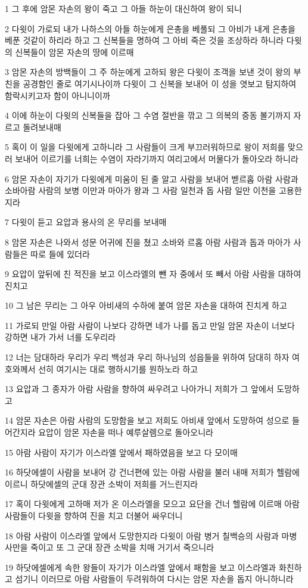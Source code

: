\par 1 그 후에 암몬 자손의 왕이 죽고 그 아들 하눈이 대신하여 왕이 되니
\par 2 다윗이 가로되 내가 나하스의 아들 하눈에게 은총을 베풀되 그 아비가 내게 은총을 베푼 것같이 하리라 하고 그 신복들을 명하여 그 아비 죽은 것을 조상하라 하니라 다윗의 신복들이 암몬 자손의 땅에 이르매
\par 3 암몬 자손의 방백들이 그 주 하눈에게 고하되 왕은 다윗이 조객을 보낸 것이 왕의 부친을 공경함인 줄로 여기시나이까 다윗이 그 신복을 보내어 이 성을 엿보고 탐지하여 함락시키고자 함이 아니니이까
\par 4 이에 하눈이 다윗의 신복들을 잡아 그 수염 절반을 깎고 그 의복의 중동 볼기까지 자르고 돌려보내매
\par 5 혹이 이 일을 다윗에게 고하니라 그 사람들이 크게 부끄러워하므로 왕이 저희를 맞으러 보내어 이르기를 너희는 수염이 자라기까지 여리고에서 머물다가 돌아오라 하니라
\par 6 암몬 자손이 자기가 다윗에게 미움이 된 줄 알고 사람을 보내어 벧르홉 아람 사람과 소바아람 사람의 보병 이만과 마아가 왕과 그 사람 일천과 돕 사람 일만 이천을 고용한지라
\par 7 다윗이 듣고 요압과 용사의 온 무리를 보내매
\par 8 암몬 자손은 나와서 성문 어귀에 진을 쳤고 소바와 르홉 아람 사람과 돕과 마아가 사람들은 따로 들에 있더라
\par 9 요압이 앞뒤에 친 적진을 보고 이스라엘의 뺀 자 중에서 또 빼서 아람 사람을 대하여 진치고
\par 10 그 남은 무리는 그 아우 아비새의 수하에 붙여 암몬 자손을 대하여 진치게 하고
\par 11 가로되 만일 아람 사람이 나보다 강하면 네가 나를 돕고 만일 암몬 자손이 너보다 강하면 내가 가서 너를 도우리라
\par 12 너는 담대하라 우리가 우리 백성과 우리 하나님의 성읍들을 위하여 담대히 하자 여호와께서 선히 여기시는 대로 행하시기를 원하노라 하고
\par 13 요압과 그 종자가 아람 사람을 향하여 싸우려고 나아가니 저희가 그 앞에서 도망하고
\par 14 암몬 자손은 아람 사람의 도망함을 보고 저희도 아비새 앞에서 도망하여 성으로 들어간지라 요압이 암몬 자손을 떠나 예루살렘으로 돌아오니라
\par 15 아람 사람이 자기가 이스라엘 앞에서 패하였음을 보고 다 모이매
\par 16 하닷에셀이 사람을 보내어 강 건너편에 있는 아람 사람을 불러 내매 저희가 헬람에 이르니 하닷에셀의 군대 장관 소박이 저희를 거느린지라
\par 17 혹이 다윗에게 고하매 저가 온 이스라엘을 모으고 요단을 건너 헬람에 이르매 아람 사람들이 다윗을 향하여 진을 치고 더불어 싸우더니
\par 18 아람 사람이 이스라엘 앞에서 도망한지라 다윗이 아람 병거 칠백승의 사람과 마병 사만을 죽이고 또 그 군대 장관 소박을 치매 거기서 죽으니라
\par 19 하닷에셀에게 속한 왕들이 자기가 이스라엘 앞에서 패함을 보고 이스라엘과 화친하고 섬기니 이러므로 아람 사람들이 두려워하여 다시는 암몬 자손을 돕지 아니하니라

